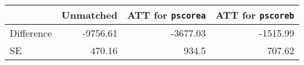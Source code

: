 \begin{table}[h!]
\begin{center}
\begin{tabular}{lrrr}
\toprule
& Unmatched & ATT for \texttt{pscorea} & ATT for \texttt{pscoreb}  \\
\hline
Difference & -9756.61 & -3677.03 & -1515.99 \\
SE & 470.16 & 934.5 & 707.62 \\
\bottomrule
\end{tabular}
\end{center}
\end{table}
